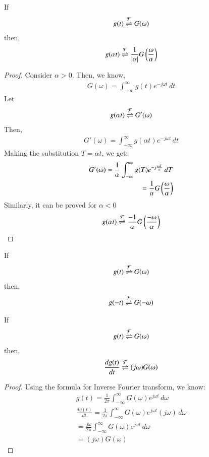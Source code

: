 \documentclass[journal,12pt,twocolumn]{IEEEtran}
\begin{document}
\begin{lemma}
If 
\begin{align}
    g(t) \overset{\mathcal{F}}{ \rightleftharpoons} G(\omega)
\end{align}
then,
\begin{align}
    g(\alpha t) \overset{\mathcal{F}}{ \rightleftharpoons} \frac{1}{\left\vert\alpha\right\vert}G\left(\frac{\omega}{\alpha}\right)
\end{align}
\label{scale}
\end{lemma}
\begin{proof}
Consider $\alpha > 0$. Then, we know, 
\begin{align}
    G(\omega) = \int_{-\infty}^\infty g(t) e^{-j \omega t} \,dt
\end{align}
Let 
\begin{align}
    g(\alpha t) \overset{\mathcal{F}}{ \rightleftharpoons} G'(\omega)
\end{align}
Then,
\begin{align}
    G'(\omega) = \int_{-\infty}^\infty g(\alpha t) e^{-j \omega t} \,dt
\end{align}
Making the substitution $T = \alpha t$, we get:
\begin{align}
     G'(\omega) = \frac{1}{\alpha}\int_{-\infty}^\infty g(T) e^{-j \frac{\omega T}{\alpha}} \,dT\\
     = \frac{1}{\alpha}G\left(\frac{\omega}{\alpha}\right)
\end{align}
Similarly, it can be proved for $\alpha < 0$
\begin{align}
    g(\alpha t) \overset{\mathcal{F}}{ \rightleftharpoons} \frac{-1}{\alpha}G\left(\frac{-\omega}{\alpha}\right)
\end{align}
\end{proof}
\begin{corollary}
If 
\begin{align}
    g(t) \overset{\mathcal{F}}{ \rightleftharpoons} G(\omega)
\end{align}
then,
\begin{align}
    g(- t) \overset{\mathcal{F}}{ \rightleftharpoons} G(-\omega)
\end{align}
\label{reverse}
\end{corollary}
\begin{lemma}
If 
\begin{align}
    g(t) \overset{\mathcal{F}}{ \rightleftharpoons} G(\omega)
\end{align}
then,
\begin{align}
    \frac{d g(t)}{dt} \overset{\mathcal{F}}{ \rightleftharpoons} (j\omega) G(\omega)
\end{align}
\label{diff}
\end{lemma}
\begin{proof}
Using the formula for Inverse Fourier transform, we know:
\begin{align}
    g(t) = \frac{1}{2\pi}\int_{-\infty}^{\infty}G(\omega)e^{j\omega t} \,d\omega\\
    \frac{d g(t)}{dt} = \frac{1}{2\pi}\int_{-\infty}^{\infty}G(\omega)e^{j\omega t} (j\omega) \,d\omega\\
    = \frac{j\omega}{2\pi}\int_{-\infty}^{\infty}G(\omega)e^{j\omega t} \,d\omega\\
     = (j\omega)G(\omega)
\end{align}
\end{proof}
\end{document}

